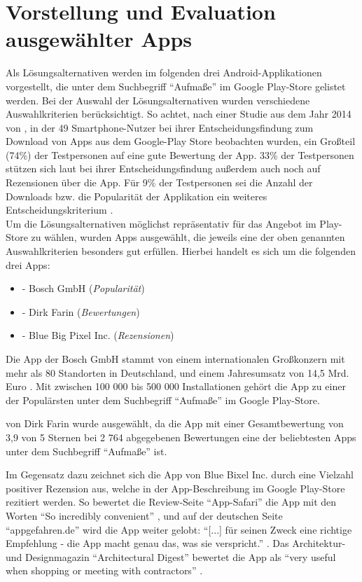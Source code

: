 \section{Vorstellung und Evaluation ausgewählter Apps}\label{sec:evaluation}
Als Lösungsalternativen werden im folgenden drei Android-Applikationen vorgestellt, die unter dem Suchbegriff ``Aufmaße'' im Google Play-Store gelistet werden.
Bei der Auswahl der Lösungsalternativen wurden verschiedene Auswahlkriterien berücksichtigt.
So achtet, nach einer Studie aus dem Jahr 2014 von \citeauthor{Dogruel14}, in der 49 Smartphone-Nutzer bei ihrer Entscheidungsfindung zum Download von Apps aus dem Google-Play Store beobachten wurden, ein Großteil (74\%) der Testpersonen auf eine gute Bewertung der App.
33\% der Testpersonen stützen sich laut \citeauthor{Dogruel14} bei ihrer Entscheidungsfindung außerdem auch noch auf Rezensionen über die App.
Für 9\% der Testpersonen sei die Anzahl der Downloads bzw. die Popularität der Applikation ein weiteres Entscheidungskriterium \citep{Dogruel14}. \\

Um die Lösungsalternativen möglichst repräsentativ für das Angebot im Play-Store zu wählen, wurden Apps ausgewählt, die jeweils eine der oben genannten Auswahlkriterien besonders gut erfüllen.
Hierbei handelt es sich um die folgenden drei Apps:

\begin{itemize}
  \item \mm{} - Bosch GmbH (\textit{Popularität})
  \item \im{} - Dirk Farin (\textit{Bewertungen})
  \item \pm{} - Blue Big Pixel Inc. (\textit{Rezensionen})
\end{itemize}

\noindent
Die App \mm{} der Bosch GmbH stammt von einem internationalen Großkonzern mit mehr als 80 Standorten in Deutschland, und einem Jahresumsatz von 14,5 Mrd. Euro \citep{Bosch18}.
Mit zwischen 100 000 bis 500 000 Installationen gehört die App zu einer der Populärsten unter dem Suchbegriff ``Aufmaße'' im Google Play-Store.

\im{} von Dirk Farin wurde ausgewählt, da die App mit einer Gesamtbewertung von 3,9 von 5 Sternen bei 2 764 abgegebenen Bewertungen eine der beliebtesten Apps unter dem Suchbegriff ``Aufmaße'' ist.

Im Gegensatz dazu zeichnet sich die App \pm{} von Blue Bixel Inc. durch eine Vielzahl positiver Rezension aus, welche in der App-Beschreibung im Google Play-Store rezitiert werden.
So bewertet die Review-Seite ``App-Safari'' die App mit den Worten ``So incredibly convenient'' \citep{AppSafari18}, und auf der deutschen Seite ``appgefahren.de'' wird die App weiter gelobt:
``[...] für seinen Zweck eine richtige Empfehlung - die App macht genau das, was sie verspricht.'' \citep{Appgefahren18}.
Das Architektur- und Designmagazin ``Architectural Digest'' bewertet die App als ``very useful when shopping or meeting with contractors'' \citep{Architect18}. \\

